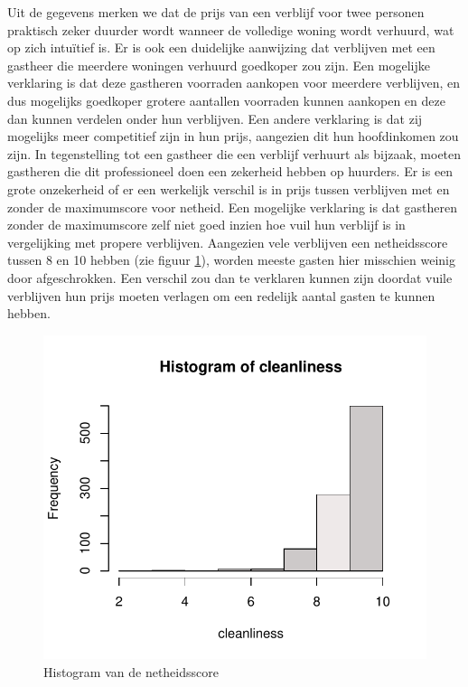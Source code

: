 \documentclass[a4paper]{kulakarticle}
\begin{document}
	Uit de gegevens merken we dat de prijs van een verblijf voor twee personen praktisch zeker duurder wordt wanneer de volledige woning wordt verhuurd, wat op zich intuïtief is.
	Er is ook een duidelijke aanwijzing dat verblijven met een gastheer die meerdere woningen verhuurd goedkoper zou zijn. Een mogelijke verklaring is dat deze gastheren voorraden aankopen voor meerdere verblijven, en dus mogelijks goedkoper grotere aantallen voorraden kunnen aankopen en deze dan kunnen verdelen onder hun verblijven. Een andere verklaring is dat zij mogelijks meer competitief zijn in hun prijs, aangezien dit hun hoofdinkomen zou zijn. In tegenstelling tot een gastheer die een verblijf verhuurt als bijzaak, moeten gastheren die dit professioneel doen een zekerheid hebben op huurders.
	Er is een grote onzekerheid of er een werkelijk verschil is in prijs tussen verblijven met en zonder de maximumscore voor netheid. Een mogelijke verklaring is dat gastheren zonder de maximumscore zelf niet goed inzien hoe vuil hun verblijf is in vergelijking met propere verblijven. Aangezien vele verblijven een netheidsscore tussen 8 en 10 hebben (zie figuur \ref{fig:cleanliness}), worden meeste gasten hier misschien weinig door afgeschrokken. Een verschil zou dan te verklaren kunnen zijn doordat vuile verblijven hun prijs moeten verlagen om een redelijk aantal gasten te kunnen hebben.
	
	\begin{figure}
		\centering
		\includegraphics{Figuren/cleanliness_hist.pdf}
		\caption{Histogram van de netheidsscore}
		\label{fig:cleanliness}
	\end{figure}
	
\end{document}
